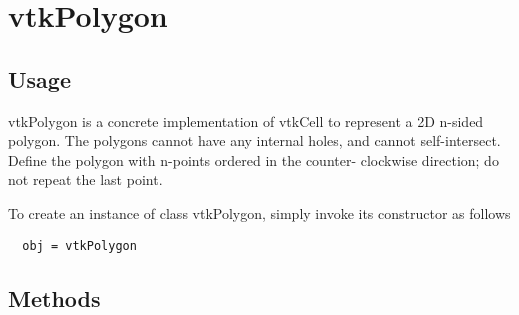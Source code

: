 \section{vtkPolygon}

\subsection{Usage}

 vtkPolygon is a concrete implementation of vtkCell to represent a 2D
 n-sided polygon. The polygons cannot have any internal holes, and cannot
 self-intersect. Define the polygon with n-points ordered in the counter-
 clockwise direction; do not repeat the last point.

To create an instance of class vtkPolygon, simply
invoke its constructor as follows
\begin{verbatim}
  obj = vtkPolygon
\end{verbatim}
\subsection{Methods}

